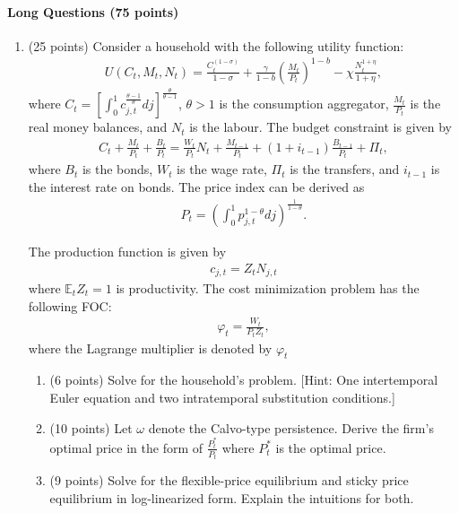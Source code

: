\documentclass[12pt]{article}
\begin{document}
\paragraph{Long Questions (75 points)}
\begin{enumerate}[label=\arabic*.]
    \item (25 points) Consider a household with the following utility function:
    \begin{align*}
        U(C_{t}, M_{t}, N_{t}) = \frac{C_{t}^{(1-\sigma)}}{1-\sigma} + \frac{\gamma}{1-b} \left( \frac{M_{t}}{P_{t}} \right)^{1-b} - \chi \frac{N_{t}^{1+\eta}}{1+\eta},
    \end{align*}
    where $C_t = \left[\int_0^1 c_{j,t}^{\frac{\theta-1}{\theta}} dj\right]^{\frac{\theta}{\theta-1}}$, $\theta > 1$ is the consumption aggregator, $\frac{M_t}{P_t}$ is the real money balances, and $N_t$ is the labour. The budget constraint is given by
    \begin{align*}
        C_t + \frac{M_t}{P_t} + \frac{B_t}{P_t} = \frac{W_t}{P_t} N_t + \frac{M_{t-1}}{P_t} + (1+i_{t-1})\frac{B_{t-1}}{P_t} + \Pi_t,
    \end{align*}
    where $B_t$ is the bonds, $W_t$ is the wage rate, $\Pi_t$ is the transfers, and $i_{t-1}$ is the interest rate on bonds. The price index can be derived as
    \begin{align*}
        P_t = \left(\int_0^1 p_{j,t} ^{1-\theta} dj\right)^{\frac{1}{1-\theta}}.
    \end{align*}
    
    The production function is given by
    \begin{align*}
        c_{j,t} = Z_t N_{j,t}
    \end{align*}
    where $\mathbb{E}_t Z_t = 1$ is productivity. The cost minimization problem has the following FOC:
    \begin{align*}
        \varphi_t = \frac{W_t}{P_t Z_t},
    \end{align*}
    where the Lagrange multiplier is denoted by $\varphi_t$
    
    \begin{enumerate}[label=(\alph*)]
        \item (6 points) Solve for the household's problem. [Hint: One intertemporal Euler equation and two intratemporal substitution conditions.]
        \item (10 points) Let $\omega$ denote the Calvo-type persistence. Derive the firm's optimal price in the form of $\frac{P^*_t}{P_t}$ where $P^*_t$ is the optimal price.
        \item (9 points) Solve for the flexible-price equilibrium and sticky price equilibrium in log-linearized form. Explain the intuitions for both.
    \end{enumerate}


\end{enumerate}
\end{document}
